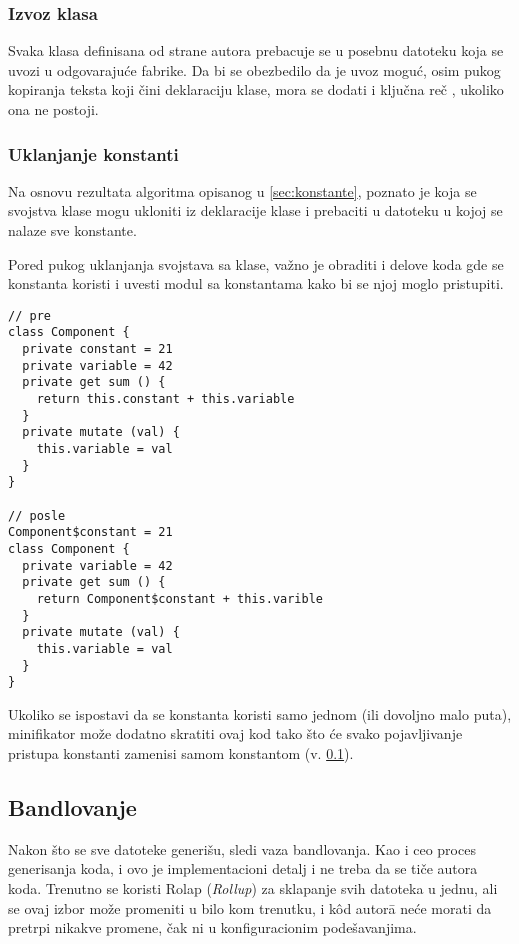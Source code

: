 \subsubsection{Izvoz klasa}

Svaka klasa definisana od strane autora prebacuje se u posebnu datoteku koja se uvozi u odgovarajuće fabrike.
Da bi se obezbedilo da je uvoz moguć, osim pukog kopiranja teksta koji čini deklaraciju klase, mora se dodati i ključna reč , ukoliko ona ne postoji.

\subsubsection{Uklanjanje konstanti}

Na osnovu rezultata algoritma opisanog u \cref{sec:konstante}, poznato je koja se svojstva klase mogu ukloniti iz deklaracije klase i prebaciti u datoteku u kojoj se nalaze sve konstante.

Pored pukog uklanjanja svojstava sa klase, važno je obraditi i delove koda gde se konstanta koristi i uvesti modul sa konstantama kako bi se njoj moglo pristupiti.

\begin{lstlisting}
// pre 
class Component {
  private constant = 21
  private variable = 42
  private get sum () {
    return this.constant + this.variable
  }
  private mutate (val) {
    this.variable = val
  }
}

// posle
Component$constant = 21
class Component {
  private variable = 42
  private get sum () {
    return Component$constant + this.varible
  }
  private mutate (val) {
    this.variable = val
  }
}
\end{lstlisting}

Ukoliko se ispostavi da se konstanta koristi samo jednom (ili dovoljno malo puta), minifikator može dodatno skratiti ovaj kod tako što će svako pojavljivanje pristupa konstanti zamenisi samom konstantom (v. \cref{subsec:bandlovanje}).

\subsection{Bandlovanje}\label{subsec:bandlovanje}

Nakon što se sve datoteke generišu, sledi vaza bandlovanja.
Kao i ceo proces generisanja koda, i ovo je implementacioni detalj i ne treba da se tiče autora koda.
Trenutno se koristi Rolap (\textsl{Rollup}) za sklapanje svih datoteka u jednu, ali se ovaj izbor može promeniti u bilo kom trenutku, i k\^od autor\=a neće morati da pretrpi nikakve promene, čak ni u konfiguracionim podešavanjima.

